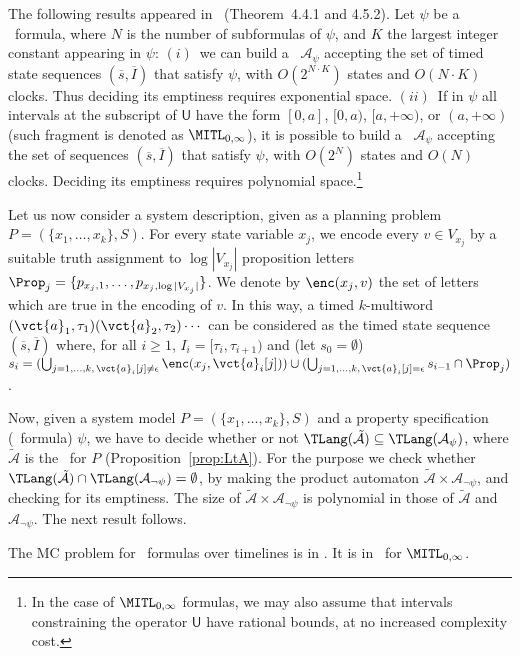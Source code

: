 The following results appeared in~\cite{Alur:1996} (Theorem~4.4.1 and 4.5.2).
Let $\psi$ be a \MITL\ formula, where $N$ is the number of subformulas of $\psi$, and $K$ the largest integer constant appearing in $\psi$:
$(i)$~we can build a \TA\ $\mathcal{A}_\psi$ accepting the set of timed state sequences $(\overline{s},\overline{I})$ that satisfy $\psi$, with $O(2^{N\cdot K})$ states and $O(N\cdot K)$ clocks. Thus deciding its emptiness requires exponential space.
$(ii)$~If in $\psi$ all intervals at the subscript of $\mathsf{U}$ have the form $[0,a]$, $[0,a)$, $[a,+\infty)$, or $(a,+\infty)$ (such fragment is denoted as $\MITL_{0,\infty}$), it is possible to build a \TA\ $\mathcal{A}_\psi$ accepting the set of sequences $(\overline{s},\overline{I})$ that satisfy $\psi$,
    with $O(2^{N})$ states and $O(N)$ clocks. Deciding its emptiness requires polynomial space.\footnote{In the case of $\MITL_{0,\infty}$ formulas, we may also assume that intervals constraining the operator $\mathsf{U}$ have rational bounds, at no increased complexity cost.}

Let us now consider a system description, given as a planning problem $P=(\{x_1,\ldots , x_k\}, \allowbreak S)$.
For every state variable $x_j$, we encode every $v\in V_{x_j}$ by a suitable truth assignment to $\log |V_{x_j}|$ proposition letters $\Prop_j=\{p_{x_j,1},\ldots, p_{x_j,\log |V_{x_j}|}\}$. 
We denote by $\enc(x_j,v)$ the set of letters which are true in the encoding of $v$.
In this way, 
a 
timed $k$-multiword $(\vct{a}_1,\tau_1)(\vct{a}_2,\tau_2)\cdots$
can be considered as the timed state sequence $(\overline{s},\overline{I})$ where, for all $i\geq 1$, $I_i=[\tau_i,\tau_{i+1})$ and
(let $s_0=\emptyset$)
$s_i=(\bigcup_{j=1,\ldots , k,\, \vct{a}_i[j]\neq \epsilon} \enc(x_j,\vct{a}_i[j]))\cup (\bigcup_{j=1,\ldots , k,\, \vct{a}_i[j]=\epsilon} s_{i-1}\cap \Prop_j)$.

Now, given a system model $P=(\{x_1,\ldots , x_k\},S)$ and a property specification (\MITL\ formula) $\psi$, we have to decide whether or not $\TLang(\tilde{\mathcal{A}})\subseteq \TLang(\mathcal{A}_\psi)$, where $\tilde{\mathcal{A}}$ is the \TA\ for $P$ (Proposition~\ref{prop:LtA}).
For the purpose we check whether $\TLang(\tilde{\mathcal{A}})\cap \TLang(\mathcal{A}_{\neg \psi})= \emptyset$, by making the product automaton 
$\tilde{\mathcal{A}}\times \mathcal{A}_{\neg \psi}$, and checking for its emptiness. The size of $\tilde{\mathcal{A}}\times \mathcal{A}_{\neg \psi}$ is polynomial in those of $\tilde{\mathcal{A}}$ and $ \mathcal{A}_{\neg \psi}$.
The next result follows.

\begin{theorem}
The MC problem for \MITL\ formulas over timelines is in \EXPSPACE.
It is in \Psp\ for $\MITL_{0,\infty}$.
\end{theorem}